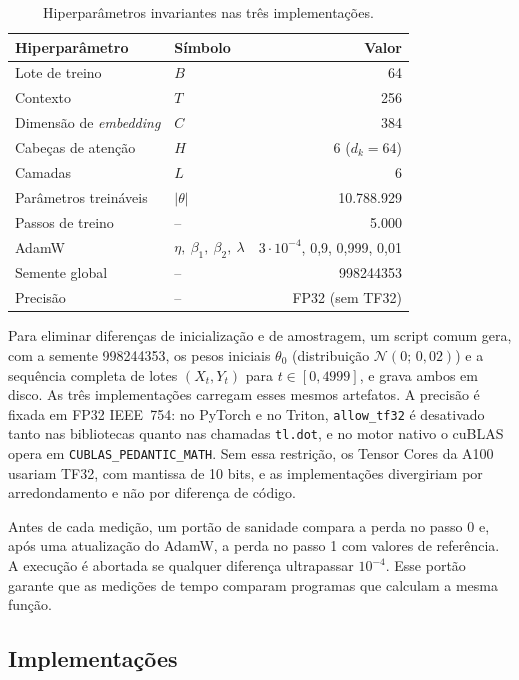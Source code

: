 \documentclass[conference]{IEEEtran}
\begin{document}
\begin{table}[t]
\centering
\caption{Hiperparâmetros invariantes nas três implementações.}
\label{tab:hiperparametros}
\begin{tabular}{@{}llr@{}}
\toprule
Hiperparâmetro & Símbolo & Valor \\
\midrule
Lote de treino & $B$ & 64 \\
Contexto & $T$ & 256 \\
Dimensão de \textit{embedding} & $C$ & 384 \\
Cabeças de atenção & $H$ & 6 ($d_k=64$) \\
Camadas & $L$ & 6 \\
Parâmetros treináveis & $|\theta|$ & 10.788.929 \\
Passos de treino & -- & 5.000 \\
AdamW & $\eta,\ \beta_1,\ \beta_2,\ \lambda$ & $3{\cdot}10^{-4}$, 0,9, 0,999, 0,01 \\
Semente global & -- & 998244353 \\
Precisão & -- & FP32 (sem TF32) \\
\bottomrule
\end{tabular}
\end{table}

Para eliminar diferenças de inicialização e de amostragem, um script comum gera, com a semente 998244353, os pesos iniciais $\theta_0$ (distribuição $\mathcal{N}(0;\,0{,}02)$) e a sequência completa de lotes $(X_t, Y_t)$ para $t \in [0, 4999]$, e grava ambos em disco. As três implementações carregam esses mesmos artefatos. A precisão é fixada em FP32 IEEE~754: no PyTorch e no Triton, \texttt{allow\_tf32} é desativado tanto nas bibliotecas quanto nas chamadas \texttt{tl.dot}, e no motor nativo o cuBLAS opera em \texttt{CUBLAS\_PEDANTIC\_MATH}. Sem essa restrição, os Tensor Cores da A100 usariam TF32, com mantissa de 10 bits, e as implementações divergiriam por arredondamento e não por diferença de código.

Antes de cada medição, um portão de sanidade compara a perda no passo 0 e, após uma atualização do AdamW, a perda no passo 1 com valores de referência. A execução é abortada se qualquer diferença ultrapassar $10^{-4}$. Esse portão garante que as medições de tempo comparam programas que calculam a mesma função.

\subsection{Implementações}
\end{document}
